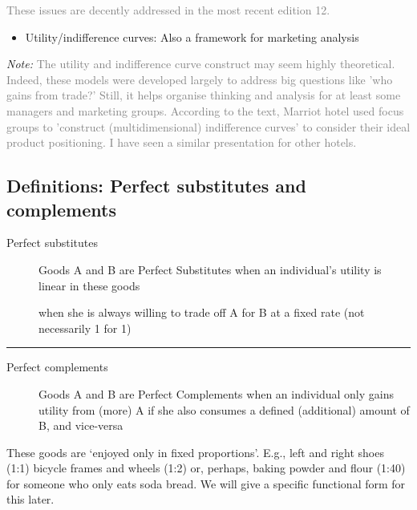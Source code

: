 \documentclass[]{article}
\providecommand{\tightlist}{%
  \setlength{\itemsep}{0pt}\setlength{\parskip}{0pt}}
\begin{document}
\textcolor{gray}{These issues are decently addressed in the most recent edition 12.}

\begin{itemize}
\tightlist
\item
  Utility/indifference curves: Also a framework for marketing analysis
\end{itemize}

\emph{Note:} \textcolor{gray}{The utility and indifference curve construct may seem highly theoretical. Indeed, these models were developed largely to address big questions like 'who gains from trade?'  Still, it helps organise thinking and analysis for at least some managers and marketing groups.  According to the text, Marriot hotel used focus groups to 'construct (multidimensional) indifference curves' to consider their ideal product positioning.
I have seen a similar presentation for other hotels.}

\hypertarget{definitions-perfect-substitutes-and-complements}{%
\subsection{Definitions: Perfect substitutes and complements}\label{definitions-perfect-substitutes-and-complements}}

\begin{description}
\item[Perfect substitutes]
Goods A and B are Perfect Substitutes when an individual's utility is linear in these goods

when she is always willing to trade off A for B at a fixed rate (not necessarily 1 for 1)
\end{description}

\begin{center}\rule{0.5\linewidth}{\linethickness}\end{center}

\begin{description}
\item[Perfect complements]
Goods A and B are Perfect Complements when an individual only gains utility from (more) A if she also consumes a defined (additional) amount of B, and vice-versa
\end{description}

\bigskip

These goods are `enjoyed only in fixed proportions'. E.g., left and right shoes (1:1) bicycle frames and wheels (1:2) or, perhaps, baking powder and flour (1:40) for someone who only eats soda bread. We will give a specific functional form for this later.
\end{document}
